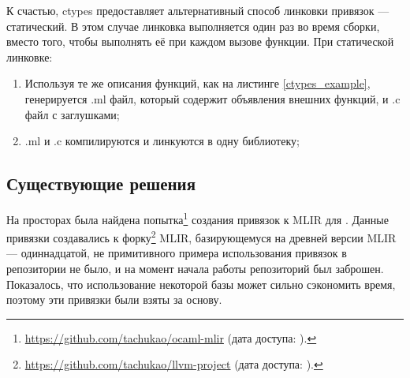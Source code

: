К счастью, ctypes предоставляет альтернативный способ линковки привязок --- статический. В этом случае линковка выполняется один раз во время сборки, вместо того, чтобы выполнять её при каждом вызове функции. При статической линковке:
\begin{enumerate}
	\item Используя те же описания функций, как на листинге \ref{ctypes_example}, генерируется .ml файл, который содержит объявления внешних функций, и .c файл с заглушками;
	\item .ml и .c компилируются и линкуются в одну библиотеку;
\end{enumerate}

\subsection{Существующие решения}

На просторах \GitHub{} была найдена попытка\footnote{\url{https://github.com/tachukao/ocaml-mlir} (дата доступа:   ).} создания привязок к MLIR для \OCaml{}. Данные привязки создавались к форку\footnote{\url{https://github.com/tachukao/llvm-project} (дата доступа:   ).} MLIR, базирующемуся на древней версии MLIR --- одиннадцатой, не примитивного примера использования привязок в репозитории не было, и на момент начала работы репозиторий был заброшен. Показалось, что использование некоторой базы может сильно сэкономить время, поэтому эти привязки были взяты за основу.
